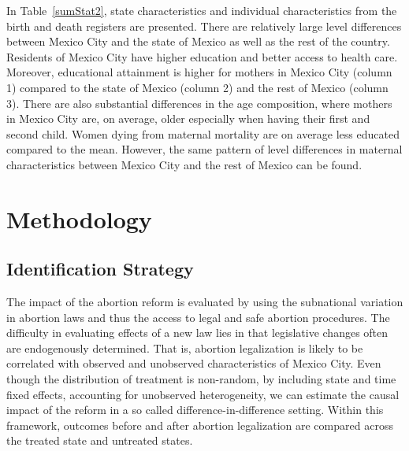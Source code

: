 \documentclass[a4paper, 11pt]{article}
\begin{document}
\begin{spacing}{2}
In Table~\ref{sumStat2}, state characteristics and individual characteristics from the birth and death registers are presented. There are relatively large level differences between Mexico City and the state of Mexico as well as the rest of the country. Residents of Mexico City have higher education and better access to health care. Moreover, educational attainment is higher for mothers in Mexico City (column 1) compared to the state of Mexico (column 2) and the rest of Mexico (column 3). There are also substantial differences in the age composition, where mothers in Mexico City are, on average, older especially when having their first and second child. Women dying from maternal mortality are on average less educated compared to the mean. However, the same pattern of level differences in maternal characteristics between Mexico City and the rest of Mexico can be found.


\section{Methodology}\label{methodology}
 \subsection{Identification Strategy}
The impact of the abortion reform is evaluated by using the subnational variation in abortion laws and thus the access to legal and safe abortion procedures. The difficulty in evaluating effects of a new law lies in that legislative changes often are endogenously determined. That is, abortion legalization is likely to be correlated with observed and unobserved characteristics of Mexico City. Even though the distribution of treatment is non-random, by including state and time fixed effects, accounting for unobserved heterogeneity, we can estimate the causal impact of the reform in a so called difference-in-difference setting. Within this framework, outcomes before and after abortion legalization are compared across the treated state and untreated states. 


\end{spacing}
\end{document}
